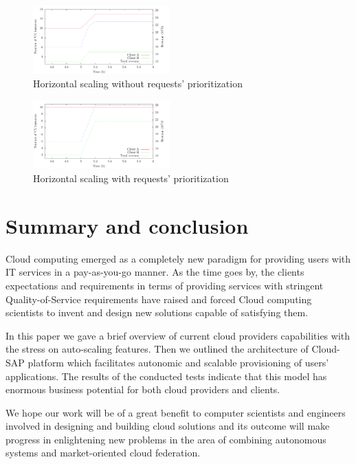 \documentclass[twocolumn]{svjour3}          %
\begin{document}
\begin{figure}
  \includegraphics[width=0.47\textwidth]{figures/request-priority-revenue-1}
\caption{Horizontal scaling without  requests' prioritization}
\label{fig:hor-scaling-no-prioritization}       %
\end{figure}

\begin{figure}
  \includegraphics[width=0.47\textwidth]{figures/request-priority-revenue-2}
\caption{Horizontal scaling with requests' prioritization}
\label{fig:hor-scaling-with-prioritization}       %
\end{figure}


\section{Summary and conclusion}
Cloud computing emerged as a completely new paradigm for providing users with IT services in a pay-as-you-go manner. As the time goes by, the clients expectations and requirements in terms of providing services with stringent Quality-of-Service requirements have raised and forced Cloud computing scientists to invent and design new solutions capable of satisfying them.

In this paper we gave a brief overview of current cloud providers capabilities with the stress on auto-scaling features. Then we outlined the architecture of Cloud-SAP platform which facilitates autonomic and scalable provisioning of users' applications. The results of the conducted tests indicate that this model has enormous business potential for both cloud providers and clients.

We hope our work will be of a great benefit to computer scientists and engineers involved in designing and building cloud solutions and its outcome will make progress in enlightening new problems in the area of combining autonomous systems and market-oriented cloud federation.
\end{document}
